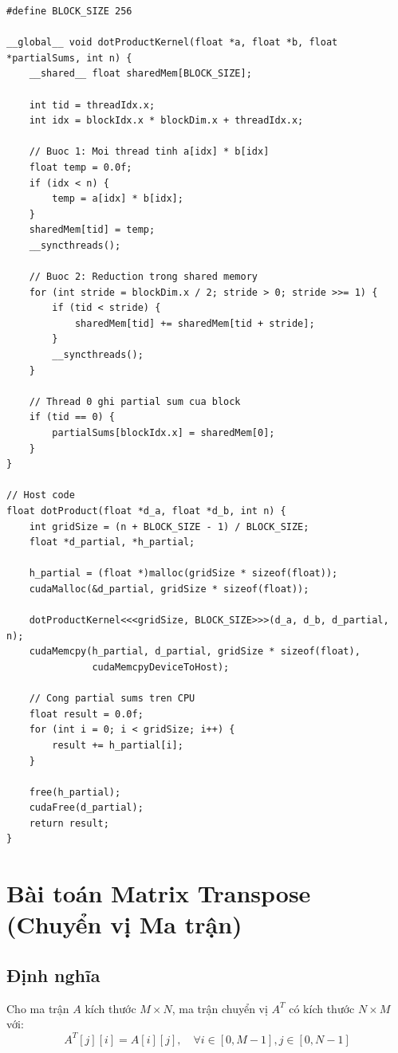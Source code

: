 \begin{lstlisting}[caption={Dot Product Kernel với Reduction}, label={lst:dot_product_kernel}]
#define BLOCK_SIZE 256

__global__ void dotProductKernel(float *a, float *b, float *partialSums, int n) {
    __shared__ float sharedMem[BLOCK_SIZE];
    
    int tid = threadIdx.x;
    int idx = blockIdx.x * blockDim.x + threadIdx.x;
    
    // Buoc 1: Moi thread tinh a[idx] * b[idx]
    float temp = 0.0f;
    if (idx < n) {
        temp = a[idx] * b[idx];
    }
    sharedMem[tid] = temp;
    __syncthreads();
    
    // Buoc 2: Reduction trong shared memory
    for (int stride = blockDim.x / 2; stride > 0; stride >>= 1) {
        if (tid < stride) {
            sharedMem[tid] += sharedMem[tid + stride];
        }
        __syncthreads();
    }
    
    // Thread 0 ghi partial sum cua block
    if (tid == 0) {
        partialSums[blockIdx.x] = sharedMem[0];
    }
}

// Host code
float dotProduct(float *d_a, float *d_b, int n) {
    int gridSize = (n + BLOCK_SIZE - 1) / BLOCK_SIZE;
    float *d_partial, *h_partial;
    
    h_partial = (float *)malloc(gridSize * sizeof(float));
    cudaMalloc(&d_partial, gridSize * sizeof(float));
    
    dotProductKernel<<<gridSize, BLOCK_SIZE>>>(d_a, d_b, d_partial, n);
    cudaMemcpy(h_partial, d_partial, gridSize * sizeof(float), 
               cudaMemcpyDeviceToHost);
    
    // Cong partial sums tren CPU
    float result = 0.0f;
    for (int i = 0; i < gridSize; i++) {
        result += h_partial[i];
    }
    
    free(h_partial);
    cudaFree(d_partial);
    return result;
}
\end{lstlisting}

\section{Bài toán Matrix Transpose (Chuyển vị Ma trận)}

\subsection{Định nghĩa}

Cho ma trận $A$ kích thước $M \times N$, ma trận chuyển vị $A^T$ có kích thước $N \times M$ với:
\begin{equation}
A^T[j][i] = A[i][j], \quad \forall i \in [0, M-1], j \in [0, N-1]
\end{equation}

